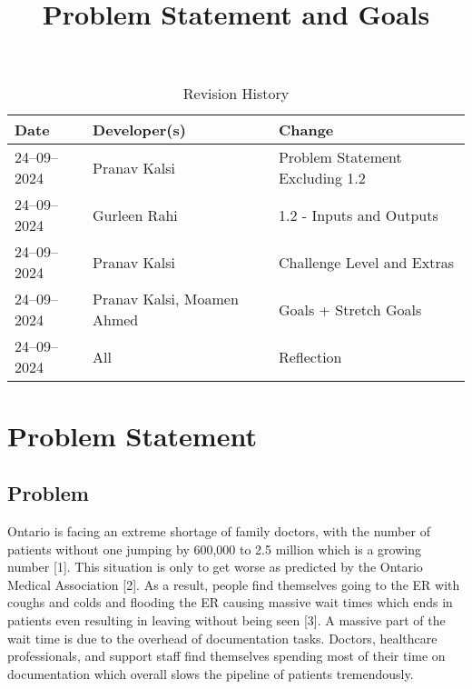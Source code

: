 \documentclass{article}
\title{Problem Statement and Goals\\\progname}
\author{\authname}
\date{}
\begin{document}
\maketitle

\begin{table}[hp]
\caption{Revision History} \label{TblRevisionHistory}
\begin{tabularx}{\textwidth}{llX}
\toprule
\textbf{Date} & \textbf{Developer(s)} & \textbf{Change}\\
\midrule
24--09--2024 & Pranav Kalsi & Problem Statement Excluding 1.2\\
24--09--2024 & Gurleen Rahi & 1.2 - Inputs and Outputs\\
24--09--2024 & Pranav Kalsi & Challenge Level and Extras\\
24--09--2024 & Pranav Kalsi, Moamen Ahmed & Goals + Stretch Goals\\
24--09--2024 & All & Reflection\\
\bottomrule
\end{tabularx}
\end{table}

\section{Problem Statement}

\subsection{Problem}

Ontario is facing an extreme shortage of family doctors, with the number of patients without one jumping by 600,000 to 2.5 million which is a growing number [1]. This situation is only to get worse as predicted by the Ontario Medical Association [2]. As a result, people find themselves going to the ER with coughs and colds and flooding the ER causing massive wait times which ends in patients even resulting in leaving without being seen [3]. A massive part of the wait time is due to the overhead of documentation tasks. Doctors, healthcare professionals, and support staff find themselves spending most of their time on documentation which overall slows the pipeline of patients tremendously.
\end{document}
